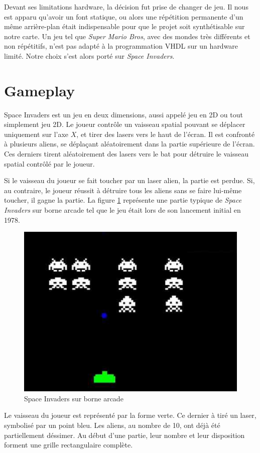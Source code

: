 \documentclass[french]{nakrule}
\begin{document}
Devant ses limitations hardware, la décision fut prise de changer de jeu. Il nous
est apparu qu'avoir un font statique, ou alors une répétition permanente d'un
même arrière-plan était indispensable pour que le projet soit synthétisable sur
notre carte. Un jeu tel que \emph{Super Mario Bros}, avec des mondes très
différents et non répétitifs, n'est pas adapté à la programmation VHDL sur un
hardware limité. Notre choix s'est alors porté sur \emph{Space Invaders}.


\clearpage
\symmetricalPage

\section{Gameplay}
\label{sec:gameplay}

Space Invaders est un jeu en deux dimensions, aussi appelé jeu en 2D ou tout
simplement jeu 2D. Le joueur contrôle un vaisseau spatial pouvant se déplacer
uniquement sur l'axe $X$, et tirer des lasers vers le haut de l'écran. Il est
confronté à plusieurs aliens, se déplaçant aléatoirement dans la partie
supérieure de l'écran. Ces derniers tirent aléatoirement des lasers vers le bat
pour détruire le vaisseau spatial contrôlé par le joueur.

Si le vaisseau du joueur se fait toucher par un laser alien, la partie est
perdue. Si, au contraire, le joueur réussit à détruire tous les aliens sans se
faire lui-même toucher, il gagne la partie. La figure \ref{gameOnArcade} représente une
partie typique de \emph{Space Invaders} sur borne arcade tel que le jeu était
lors de son lancement initial en 1978.

\begin{figure}[ht]
  \centering
  \includegraphics[width=.6\textwidth]{pictures/gameOnArcade}
  \caption{Space Invaders sur borne arcade}
  \label{gameOnArcade}
\end{figure}

Le vaisseau du joueur est représenté par la forme verte. Ce dernier à tiré un
laser, symbolisé par un point bleu. Les aliens, au nombre de 10, ont déjà été
partiellement déssimer. Au début d'une partie, leur nombre et leur disposition
forment une grille rectangulaire complète.
\end{document}
